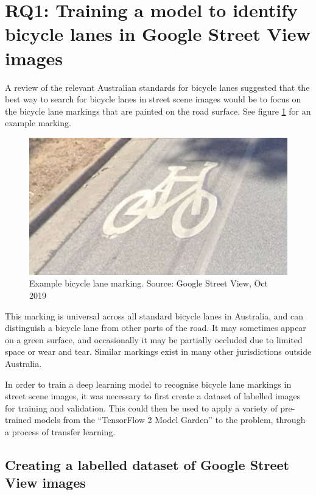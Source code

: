 \documentclass[11pt,twoside]{report}
\begin{document}
\section{RQ1: Training a model to identify bicycle lanes in Google Street View images}
\label{s:rq1}

A review of the relevant Australian standards for bicycle lanes \cite{standards} suggested that the best way to search for bicycle lanes in street scene images would be to focus on the bicycle lane markings that are painted on the road surface.  See figure \ref{fig:symbol} for an example marking.  

\begin{figure}[h]
\centering
\includegraphics[scale=0.550]{f001_symbol.png}
\caption{Example bicycle lane marking.  Source: Google Street View, Oct 2019}
\label{fig:symbol}
\end{figure}

This marking is universal across all standard bicycle lanes in Australia, and can distinguish a bicycle lane from other parts of the road.  It may sometimes appear on a green surface, and occasionally it may be partially occluded due to limited space or wear and tear.  Similar markings exist in many other jurisdictions outside Australia.

In order to train a deep learning model to recognise bicycle lane markings in street scene images, it was necessary to first create a dataset of labelled images for training and validation.  This could then be used to apply a variety of pre-trained models from the ``TensorFlow 2 Model Garden'' to the problem, through a process of transfer learning.

\subsection{Creating a labelled dataset of Google Street View images}
\end{document}
